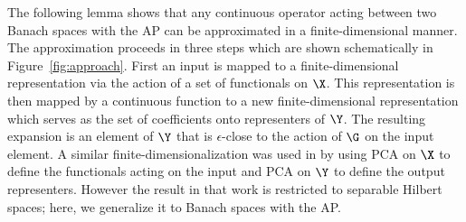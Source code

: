 The following lemma shows that any continuous operator acting between two Banach spaces with the AP can be approximated in a finite-dimensional manner. The approximation proceeds in three steps which are shown schematically in Figure~\ref{fig:approach}. First an input is mapped to a finite-dimensional representation via the action of a set of functionals on \(\X\). This representation is then mapped by a continuous function to a new finite-dimensional representation which serves as the set of coefficients onto representers of \(\Y\). The resulting expansion is an element of \(\Y\) that is \(\epsilon\)-close to the action of \(\G\) on the input element. A similar finite-dimensionalization was used in \citep{Kovachki} by using PCA on \(\X\) to define the functionals acting on the input and PCA on \(\Y\) to define the output representers. However the result in that work is restricted to separable Hilbert spaces; here, we generalize it to Banach spaces with the AP.

